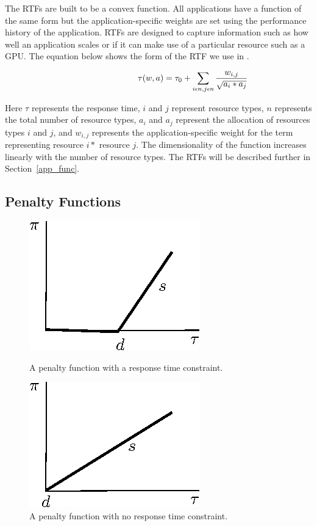 The RTFs are built to be a convex function.  All applications have a function of the same form but the application-specific weights are set using the performance history of the application.  RTFs are designed to capture information such as how well an application scales or if it can make use of a particular resource such as a GPU. The equation below shows the form of the RTF we use in \pacora. 

\begin{eqnarray*}
& \makebox[1in][r]{}   &\tau(w,a) = \tau_0 + \sum_{i\epsilon n,j\epsilon n}{\frac{w_{i,j}}{\sqrt{a_i * a_j}}} \\
\end{eqnarray*}

Here $\tau$ represents the response time, $i$ and $j$ represent resource types, $n$ represents the total number of resource types, $a_{i}$ and $a_{j}$ represent the allocation of resources types $i$ and $j$, and $w_{i,j}$ represents the application-specific weight for the term representing resource $i*$ resource $j$.  The dimensionality of the function increases linearly with the number of resource types. The RTFs will be described further in Section~\ref{app_func}.

\subsection*{Penalty Functions}

\begin{figure}[hb]
\parbox{1.6in}{
\includegraphics*{Penalty1.eps}
\caption{\label{f:pen1}A penalty function with a response time constraint.}
}
\hspace{\fill}
\parbox{1.6in}{
\includegraphics*{Penalty2.eps}
\caption{\label{f:pen2}A penalty function with no response time constraint.}
}
\end{figure}

